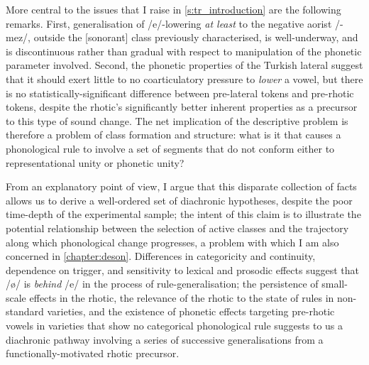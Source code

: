 More central to the issues that I raise in \cref{s:tr_introduction} are the following remarks. First, generalisation of /e/-lowering \emph{at least} to the negative aorist /-mez/, outside the [sonorant] class previously characterised, is well-underway, and is discontinuous rather than gradual with respect to manipulation of the phonetic parameter involved. Second, the phonetic properties of the Turkish lateral suggest that it should exert little to no coarticulatory pressure to \emph{lower} a vowel, but there is no statistically-significant difference between pre-lateral tokens and pre-rhotic tokens, despite the rhotic's significantly better inherent properties as a precursor to this type of sound change. The net implication of the descriptive problem is therefore a problem of class formation and structure: what is it that causes a phonological rule to involve a set of segments that do not conform either to representational unity or phonetic unity?

From an explanatory point of view, I argue that this disparate collection of facts allows us to derive a well-ordered set of diachronic hypotheses, despite the poor time-depth of the experimental sample; the intent of this claim is to illustrate the potential relationship between the selection of active classes and the trajectory along which phonological change progresses, a problem with which I am also concerned in \cref{chapter:deson}. Differences in categoricity and continuity, dependence on trigger, and sensitivity to lexical and prosodic effects suggest that /\o/ is \emph{behind} /e/ in the process of rule-generalisation; the persistence of small-scale effects in the rhotic, the relevance of the rhotic to the state of rules in non-standard varieties, and the existence of phonetic effects targeting pre-rhotic vowels in varieties that show no categorical phonological rule suggests to us a diachronic pathway involving a series of successive generalisations from a functionally-motivated rhotic precursor.
